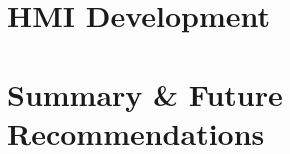 \documentclass{book}
\begin{document}
\chapter{HMI Development}
    \label{chap:hmi}
    
    \newpage
    
\chapter{Summary \& Future Recommendations}
    \label{chap:summary}
    
    \newpage
    
\printbibliography


\end{document}
